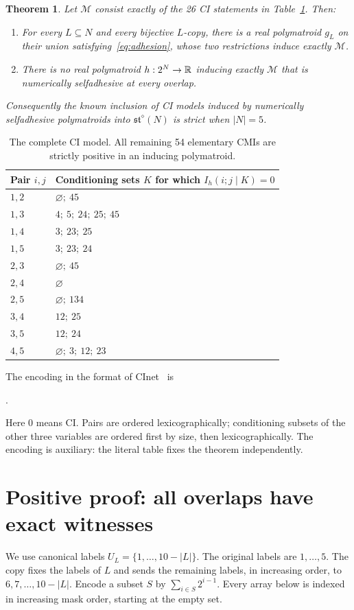 \documentclass[11pt]{article}
\newtheorem{theorem}{Theorem}\newtheorem{lemma}[theorem]{Lemma}
\newcommand{\M}{\mathcal M}\newcommand{\st}{\mathfrak{st}}
\begin{document}
\begin{theorem}\label{thm:main}
Let $\M$ consist exactly of the 26 CI statements in Table~\ref{tab:model}.
Then:
\begin{enumerate}
\item For every $L\subseteq N$ and every bijective $L$-copy, there is a real
polymatroid $g_L$ on their union satisfying~\eqref{eq:adhesion}, whose two
restrictions induce exactly $\M$.
\item There is no real polymatroid $h:2^N\to\mathbb R$ inducing exactly $\M$ that is
numerically selfadhesive at every overlap.
\end{enumerate}
Consequently the known inclusion of CI models induced by numerically
selfadhesive polymatroids into $\st^{\diamond}(N)$ is strict when $|N|=5$.
\end{theorem}
\begin{table}[ht]\centering
\begin{tabular}{ll}\toprule
Pair $i,j$ & Conditioning sets $K$ for which $I_h(i;j\mid K)=0$\\\midrule
$1,2$ &$\varnothing;\ 45$\\
$1,3$ &$4;\ 5;\ 24;\ 25;\ 45$\\
$1,4$ &$3;\ 23;\ 25$\\
$1,5$ &$3;\ 23;\ 24$\\
$2,3$ &$\varnothing;\ 45$\\
$2,4$ &$\varnothing$\\
$2,5$ &$\varnothing;\ 134$\\
$3,4$ &$12;\ 25$\\
$3,5$ &$12;\ 24$\\
$4,5$ &$\varnothing;\ 3;\ 12;\ 23$\\\bottomrule
\end{tabular}
\caption{The complete CI model. All remaining 54 elementary CMIs are strictly
positive in an inducing polymatroid.}\label{tab:model}
\end{table}
The encoding in the format of CInet~\cite{CInet} is
\begin{center}\small{}.
\end{center}
Here 0 means CI. Pairs are ordered lexicographically; conditioning subsets of
the other three variables are ordered first by size, then lexicographically.
The encoding is auxiliary: the literal table fixes the theorem independently.

\section{Positive proof: all overlaps have exact witnesses}\label{sec:positive}
We use canonical labels $U_L=\{1,\ldots,10-|L|\}$. The original labels are
$1,\ldots,5$. The copy fixes the labels of $L$ and sends the remaining labels,
in increasing order, to $6,7,\ldots,10-|L|$. Encode a subset $S$ by
$\sum_{i\in S}2^{i-1}$. Every array below is indexed in increasing mask order,
starting at the empty set.
\end{document}
